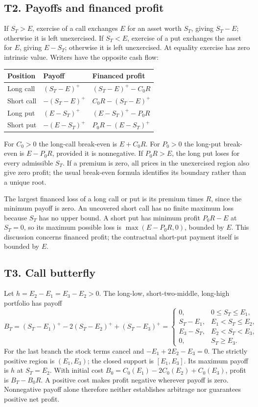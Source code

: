 \documentclass[11pt,a4paper]{article}
\begin{document}
\subsection{T2. Payoffs and financed profit}
If $S_T>E$, exercise of a call exchanges $E$ for an asset worth $S_T$, giving $S_T-E$; otherwise it is left unexercised. If $S_T<E$, exercise of a put exchanges the asset for $E$, giving $E-S_T$; otherwise it is left unexercised. At equality exercise has zero intrinsic value. Writers have the opposite cash flow:
\begin{center}\begin{tabular}{lll}\toprule
Position & Payoff & Financed profit\\\midrule
Long call & $(S_T-E)^+$ & $(S_T-E)^+-C_0R$\\
Short call & $-(S_T-E)^+$ & $C_0R-(S_T-E)^+$\\
Long put & $(E-S_T)^+$ & $(E-S_T)^+-P_0R$\\
Short put & $-(E-S_T)^+$ & $P_0R-(E-S_T)^+$\\\bottomrule
\end{tabular}\end{center}
For $C_0>0$ the long-call break-even is $E+C_0R$. For $P_0>0$ the long-put break-even is $E-P_0R$, provided it is nonnegative. If $P_0R>E$, the long put loses for every admissible $S_T$. If a premium is zero, all prices in the unexercised region also give zero profit; the usual break-even formula identifies its boundary rather than a unique root.

The largest financed loss of a long call or put is its premium times $R$, since the minimum payoff is zero. An uncovered short call has no finite maximum loss because $S_T$ has no upper bound. A short put has minimum profit $P_0R-E$ at $S_T=0$, so its maximum possible loss is $\max(E-P_0R,0)$, bounded by $E$. This discussion concerns financed profit; the contractual short-put payment itself is bounded by $E$.

\subsection{T3. Call butterfly}
Let $h=E_2-E_1=E_3-E_2>0$. The long-low, short-two-middle, long-high portfolio has payoff
\[
B_T=(S_T-E_1)^+-2(S_T-E_2)^++(S_T-E_3)^+
=\begin{cases}
0,&0\leq S_T\leq E_1,\\
S_T-E_1,&E_1<S_T\leq E_2,\\
E_3-S_T,&E_2<S_T<E_3,\\
0,&S_T\geq E_3.
\end{cases}
\]
For the last branch the stock terms cancel and $-E_1+2E_2-E_3=0$. The strictly positive region is $(E_1,E_3)$; the closed support is $[E_1,E_3]$. Its maximum payoff is $h$ at $S_T=E_2$. With initial cost $B_0=C_0(E_1)-2C_0(E_2)+C_0(E_3)$, profit is $B_T-B_0R$. A positive cost makes profit negative wherever payoff is zero. Nonnegative payoff alone therefore neither establishes arbitrage nor guarantees positive net profit.
\end{document}
